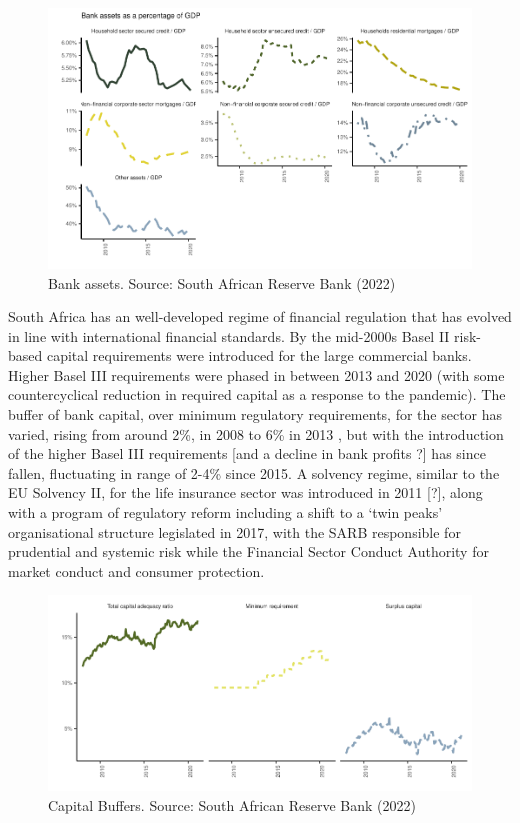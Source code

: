\documentclass[
]{article}
\begin{document}
\begin{figure}[H]

\includegraphics{Bank_capital_and_bank_lending_files/figure-latex/unnamed-chunk-2-1} \hfill{}

\caption{Bank assets. Source: South African Reserve Bank (2022)}\label{fig:unnamed-chunk-2}
\end{figure}

South Africa has an well-developed regime of financial regulation that has evolved in line with international financial standards. By the mid-2000s Basel II risk-based capital requirements were introduced for the large commercial banks. Higher Basel III requirements were phased in between 2013 and 2020 (with some countercyclical reduction in required capital as a response to the pandemic). The buffer of bank capital, over minimum regulatory requirements, for the sector has varied, rising from around 2\%, in 2008 to 6\% in 2013 , but with the introduction of the higher Basel III requirements {[}and a decline in bank profits ?{]} has since fallen, fluctuating in range of 2-4\% since 2015. A solvency regime, similar to the EU Solvency II, for the life insurance sector was introduced in 2011 {[}?{]}, along with a program of regulatory reform including a shift to a `twin peaks' organisational structure legislated in 2017, with the SARB responsible for prudential and systemic risk while the Financial Sector Conduct Authority for market conduct and consumer protection.

\begin{figure}[H]

\includegraphics{Bank_capital_and_bank_lending_files/figure-latex/unnamed-chunk-3-1} \hfill{}

\caption{Capital Buffers. Source: South African Reserve Bank (2022)}\label{fig:unnamed-chunk-3}
\end{figure}
\end{document}
